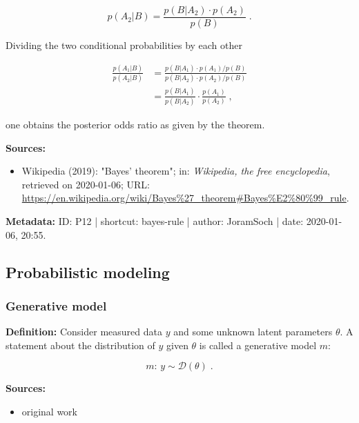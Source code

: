 \documentclass[a4paper,12pt]{book}
\begin{document}
\begin{equation} \label{eq:bayes-rule-bayes-th-A2}
p(A_2|B) = \frac{p(B|A_2) \cdot p(A_2)}{p(B)} \; .
\end{equation}

Dividing the two conditional probabilities by each other

\begin{equation} \label{eq:bayes-rule-bayes-rule-qed}
\begin{split}
\frac{p(A_1|B)}{p(A_2|B)} &= \frac{p(B|A_1) \cdot p(A_1) / p(B)}{p(B|A_2) \cdot p(A_2) / p(B)} \\
&= \frac{p(B|A_1)}{p(B|A_2)} \cdot \frac{p(A_1)}{p(A_2)} \; ,
\end{split}
\end{equation}

one obtains the posterior odds ratio as given by the theorem.

\vspace{1em}
\textbf{Sources:}
\begin{itemize}
\item Wikipedia (2019): "Bayes' theorem"; in: \textit{Wikipedia, the free encyclopedia}, retrieved on 2020-01-06; URL: \url{https://en.wikipedia.org/wiki/Bayes%27_theorem#Bayes%E2%80%99_rule}.
\end{itemize}


\vspace{1em}
\textbf{Metadata:} ID: P12 | shortcut: bayes-rule | author: JoramSoch | date: 2020-01-06, 20:55.


\subsection{Probabilistic modeling}

\subsubsection[\textit{Generative model}]{Generative model} \label{sec:gm}

\vspace{1em}
\textbf{Definition:} Consider measured data $y$ and some unknown latent parameters $\theta$. A statement about the distribution of $y$ given $\theta$ is called a generative model $m$:

\begin{equation} \label{eq:gm-gm}
m: \, y \sim \mathcal{D}(\theta) \; .
\end{equation}

\vspace{1em}
\textbf{Sources:}
\begin{itemize}
\item original work\end{itemize}
\end{document}
